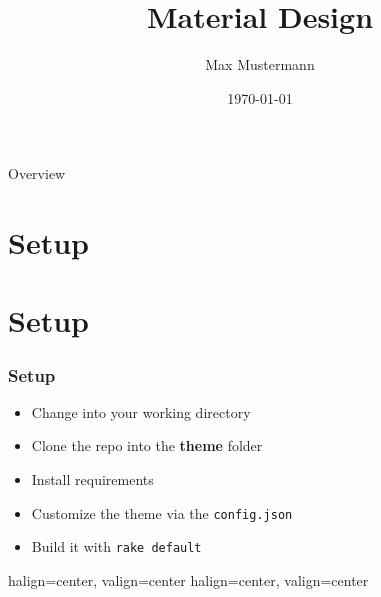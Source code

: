 \documentclass{beamer}
\title{Material Design}
\date{\today}
\author{Max Mustermann}
\begin{document}

\begin{frame}
	\titlepage
\end{frame}

{
	\begin{frame}{Overview}
		\tableofcontents
	\end{frame}
}

\section{Setup}
\section{Setup}
\begin{frame}
	\frametitle{Setup}
	\begin{itemize}
		\item Change into your working directory
		\item Clone the repo into the \textbf{theme} folder
		\item Install requirements
		\item Customize the theme via the \texttt{config.json}
		\item Build it with \texttt{rake default}
	\end{itemize}
\end{frame}
\begin{frame}[fragile]
	{halign=center, valign=center}
	{halign=center, valign=center}
\end{frame}
\end{document}
